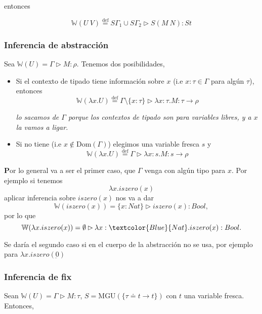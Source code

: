 \documentclass{report}
\theoremstyle{definition} %
\newenvironment{nota}[1]
    {\begin{leftbar}\textbf{#1}}
    {\end{leftbar}}
\newcommand{\eqdef}{\overset{\text{def}}{=}}
\newcommand{\tfunc}[2]{#1 \to #2}
\newcommand{\abs}[3]{\lambda #1 : #2 . #3}
\newcommand{\app}[2]{#1 \ #2} %
\newcommand{\uabs}[2]{\lambda #1 . #2} %
\newcommand{\tipa}[3]{#1 \rhd #2 : #3} %
\newcommand{\tienetipo}[3]{#1 : #2 \in #3}
\newcommand{\Gtipa}[2]{\tipa{\Gamma}{#1}{#2}}
\newcommand{\iszero}[1]{iszero(#1)}
\newcommand{\num}[1]{\underbar{#1}} %
\newcommand{\select}[1]{\textcolor{Blue}{#1}}
\newcommand{\tsust}[1]{S#1} %
\newcommand{\infer}[1]{\mathbb{W}(#1)}
\newcommand{\unify}[2]{#1 \doteq #2}
\newcommand{\mgu}[2]{\text{MGU}(\{ \unify{#1}{#2} \})}
\begin{document}
entonces

\[
    \infer{\app{U}{V}} \eqdef
    \tipa
        {\tsust{\Gamma_1} \cup \tsust{\Gamma_2}}
        {\tsust{(\app{M}{N})}}
        {\tsust{t}}
\]

\subsubsection{Inferencia de abstracción}

Sea $\infer{U} = \Gtipa{M}{\rho}$. Tenemos dos posibilidades,

\begin{itemize}
    \item Si el contexto de tipado tiene información sobre $x$
    (i.e $\tienetipo{x}{\tau}{\Gamma}$ para algún $\tau$), entonces
    \[
        \infer{\uabs{x}{U}} \eqdef
        \tipa
            {\Gamma \setminus \{ x: \tau\}}
            {\abs{x}{\tau}{M}}
            {\tfunc{\tau}{\rho}}
    \]

    \textit{lo sacamos de $\Gamma$ porque los contextos de tipado son para variables libres, y a $x$ la vamos a ligar.}

    \item Si no tiene (i.e $x \notin \text{Dom}({\Gamma})$) elegimos una
    variable fresca $s$ y
    \[
        \infer{\uabs{x}{U}} \eqdef
        \Gtipa
            {\abs{x}{s}{M}}
            {\tfunc{s}{\rho}}
    \]
\end{itemize}

\begin{nota}
    Por lo general va a ser el primer caso, que $\Gamma$ venga con algún tipo
    para $x$. Por ejemplo si tenemos
    $$\uabs{x}{\iszero{x}}$$
    aplicar inferencia sobre $\iszero{x}$ nos va a dar
    $$\infer{\iszero{x}} = \tipa{\{x: Nat\}}{\iszero{x}}{Bool},$$
    por lo que
    $$\infer{\uabs{x}{\iszero{x}}} = \tipa{\emptyset}{\abs{x}{\select{Nat}}{\iszero{x}}}{Bool}.$$

    Se daría el segundo caso si en el cuerpo de la abstracción no se usa, por
    ejemplo para $\uabs{x}{iszero(\num{0})}$
\end{nota}

\subsubsection{Inferencia de fix}

Sean $\infer{U} = \Gtipa{M}{\tau}$, $S = \mgu{\tau}{\tfunc{t}{t}}$ con $t$ una
variable fresca. Entonces,
\end{document}
